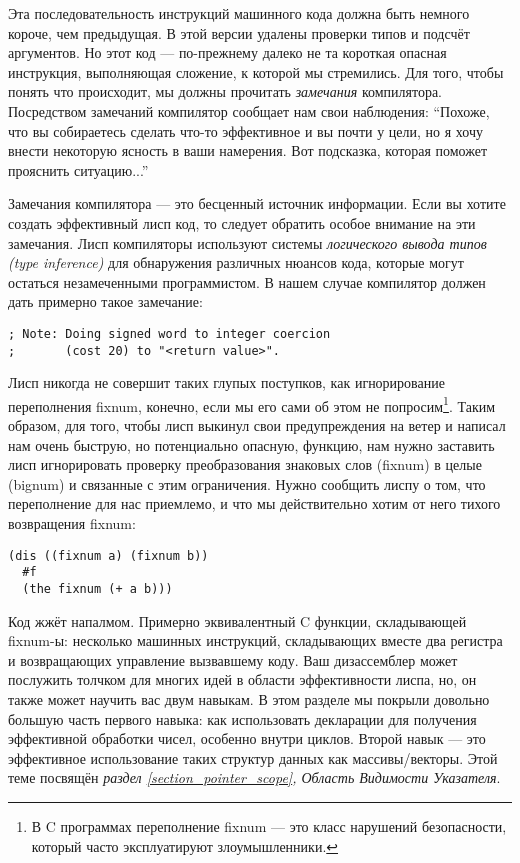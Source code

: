Эта последовательность инструкций машинного кода должна быть немного короче, чем предыдущая. В этой версии удалены проверки типов и подсчёт аргументов. Но этот код --- по-прежнему далеко не та короткая опасная инструкция, выполняющая сложение, к которой мы стремились. Для того, чтобы понять что происходит, мы должны прочитать \emph{замечания} компилятора. Посредством замечаний компилятор сообщает нам свои наблюдения: ``Похоже, что вы собираетесь сделать что-то эффективное и вы почти у цели, но я хочу внести некоторую ясность в ваши намерения. Вот подсказка, которая поможет прояснить ситуацию...''

Замечания компилятора --- это бесценный источник информации. Если вы хотите создать эффективный лисп код, то следует обратить особое внимание на эти замечания. Лисп компиляторы используют системы \emph{логического вывода типов (type inference)} для обнаружения различных нюансов кода, которые могут остаться незамеченными программистом. В нашем случае компилятор должен дать примерно такое замечание:

\begin{verbatim}
; Note: Doing signed word to integer coercion
;       (cost 20) to "<return value>".
\end{verbatim}

Лисп никогда не совершит таких глупых поступков, как игнорирование переполнения fixnum, конечно, если мы его сами об этом не попросим\footnote{В C программах переполнение fixnum --- это класс нарушений безопасности, который часто эксплуатируют злоумышленники.}. Таким образом, для того, чтобы лисп выкинул свои предупреждения на ветер и написал нам очень быструю, но потенциально опасную, функцию, нам нужно заставить лисп игнорировать проверку преобразования знаковых слов (fixnum) в целые (bignum) и связанные с этим ограничения. Нужно сообщить лиспу о том, что переполнение для нас приемлемо, и что мы действительно хотим от него тихого возвращения fixnum:

\begin{verbatim}
(dis ((fixnum a) (fixnum b))
  #f
  (the fixnum (+ a b)))
\end{verbatim}

Код жжёт напалмом. Примерно эквивалентный C функции, складывающей fixnum-ы: несколько машинных инструкций, складывающих вместе два регистра и возвращающих управление вызвавшему коду. Ваш дизассемблер может послужить толчком для многих идей в области эффективности лиспа, но, он также может научить вас двум навыкам. В этом разделе мы покрыли довольно большую часть первого навыка: как использовать декларации для получения эффективной обработки чисел, особенно внутри циклов. Второй навык --- это эффективное использование таких структур данных как массивы/векторы. Этой теме посвящён \emph{раздел \ref{section_pointer_scope}, Область Видимости Указателя}.

